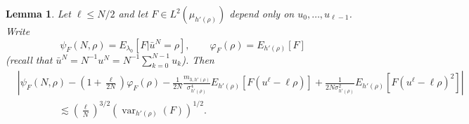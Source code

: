 \documentclass[11pt, a4paper]{article}
\newcommand{\assign}{:=}
\newcommand{\tmop}[1]{\ensuremath{\operatorname{#1}}}
\newtheorem{lemma}[theorem]{Lemma}
\newcommand{\1}{\mathbf{1}}
\begin{document}
\begin{lemma}
  \label{lem:equiv ensem}Let $\ell \leqslant N / 2$ and let $F \in L^2
  ({\mu}_{h' (\rho)})$ depend only on $u_0, \ldots, u_{\ell - 1}$. Write
  \[ \psi_F (N, \rho) = E_{\lambda_0} [F| \bar{u}^N = \rho], \hspace{2em}
     \varphi_F (\rho) = E_{h' (\rho)} [F] \]
  (recall that $\bar{u}^N = N^{- 1} u^N = N^{- 1} \sum_{k = 0}^{N - 1} u_k$).
  Then
  \begin{align}\label{eq:equiv ensem lhs} \nonumber
     & \left| \psi_F (N, \rho) - \left( 1 +
    \frac{\ell}{2 N} \right) \varphi_F (\rho) - \frac{1}{2 N} \frac{m_{3, h'
    (\rho)}}{\sigma^4_{h' (\rho)}} E_{h' (\rho)} [F (u^{\ell} - \ell \rho)] +
    \frac{1}{2 N \sigma_{h' (\rho)}^2} E_{h' (\rho)} [F (u^{\ell} - \ell
    \rho)^2] \right| \\
    & \hspace{50pt} \lesssim \left( \frac{\ell}{N} \right)^{3 / 2} (\tmop{var}_{h' (\rho)} (F))^{1 / 2}.
  \end{align}
\end{lemma}
\end{document}
